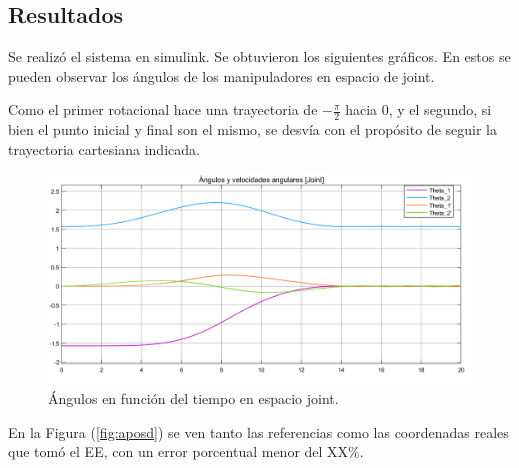 
\subsection{Resultados}
Se realizó el sistema en simulink. Se obtuvieron los siguientes gráficos.
En estos se pueden observar los ángulos de los manipuladores en espacio de joint.

Como el primer rotacional hace una trayectoria de $-\frac{\pi}{2}$ hacia $0$, y el segundo, si bien el punto inicial y final son el mismo, se desvía con el propósito de seguir la trayectoria cartesiana indicada.

\begin{figure}[H]
	\centering
	\includegraphics[width=0.8\linewidth]{ImagenesControl de posición no lineal/1_3_a}
	\caption{Ángulos en función del tiempo en espacio joint.}	
	\label{fig:athetas}
\end{figure}

En la Figura (\ref{fig:aposd}) se ven tanto las referencias como las coordenadas reales que tomó el EE, con un error porcentual menor del XX$\%$. 


